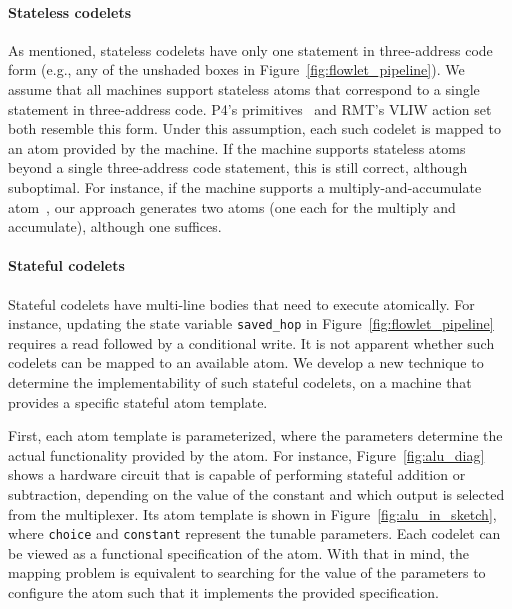 \paragraph{Stateless codelets}
As mentioned, stateless codelets have only one
statement in three-address code form (e.g., any of the unshaded boxes in
Figure~\ref{fig:flowlet_pipeline}). We assume that all
\absmachine machines support stateless atoms that correspond to a single
statement in three-address code. P4's primitives~\cite{p4spec} and RMT's VLIW
action set~\cite{rmt} both resemble this form. Under this assumption,
each such codelet is mapped to an atom provided by the
\absmachine machine. If the \absmachine machine supports stateless atoms beyond
a single three-address code statement, this is still correct, although
suboptimal. For instance, if the \absmachine machine supports a
multiply-and-accumulate atom~\cite{mac}, our approach generates two atoms (one
each for the multiply and accumulate), although one suffices.

\paragraph{Stateful codelets}
Stateful codelets have multi-line bodies that need to execute atomically. For
instance, updating the state variable \texttt{saved\_hop} in
Figure~\ref{fig:flowlet_pipeline} requires a read followed by a conditional
write.  It is not apparent whether such codelets can be mapped to an available
atom. We develop a new technique to determine the implementability of such
stateful codelets, on a \absmachine machine that provides a specific stateful
atom template.

First, each atom template is parameterized, where the parameters determine the
actual functionality provided by the atom.  For instance,
Figure~\ref{fig:alu_diag} shows a hardware circuit that is capable of
performing stateful addition or subtraction, depending on the value of the
constant and which output is selected from the multiplexer.  Its atom template
 is shown in Figure~\ref{fig:alu_in_sketch}, where {\tt choice}
and {\tt constant} represent the tunable parameters.  Each codelet can be
viewed as a functional specification of the atom.  With that in mind, the
mapping problem is equivalent to searching for the value of the parameters to
configure the atom such that it implements the provided specification.

